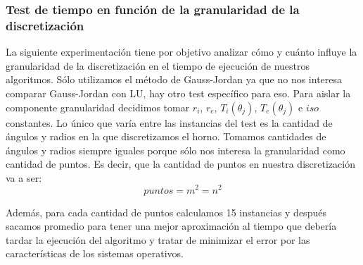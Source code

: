 \subsubsection{Test de tiempo en función de la granularidad de la discretización}
La siguiente experimentación tiene por objetivo analizar cómo y cuánto influye la granularidad de la discretización en el tiempo de ejecución de nuestros algoritmos. Sólo utilizamos el método de Gauss-Jordan ya que no nos interesa comparar Gauss-Jordan con LU, hay otro test específico para eso.
Para aislar la componente granularidad decidimos tomar $r_i$, $r_e$, $T_i(\theta_j)$, $T_e(\theta_j)$ e $iso$ constantes. Lo único que varía entre las instancias del test es la cantidad de ángulos y radios en la que discretizamos el horno. Tomamos cantidades de ángulos y radios siempre iguales porque sólo nos interesa la granularidad como cantidad de puntos. Es decir, que la cantidad de puntos en nuestra discretización va a ser:
\begin{equation}
 puntos = m^2 = n^2
\end{equation}

Además, para cada cantidad de puntos calculamos 15 instancias y después sacamos promedio para tener
una mejor aproximación al tiempo que debería tardar la ejecución del algoritmo y tratar de minimizar
el error por las características de los sistemas operativos.
